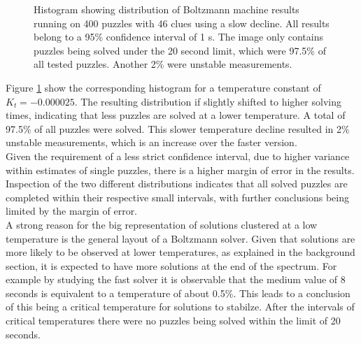 \documentclass[a4paper,11pt]{kth-mag}
\begin{document}
\begin{figure}[here] 
\noindent{}
\vspace{-15pt}
\caption{Histogram showing distribution of Boltzmann machine results running on 400 puzzles with 46 clues using a slow decline. All results belong to a 95\% confidence interval of 1 s. The image only contains puzzles being solved under the 20 second limit, which were 97.5\% of all tested puzzles. Another 2\% were unstable measurements.}
\label{fig:boltzmannMedium}
\end{figure}

Figure \ref{fig:boltzmannMedium} show the corresponding histogram for a temperature constant of $K_t = -0.000025$.
The resulting distribution if slightly shifted to higher solving times, indicating that less puzzles are solved at a lower temperature.
A total of 97.5\% of all puzzles were solved.
This slower temperature decline resulted in 2\% unstable measurements, which is an increase over the faster version. \\

Given the requirement of a less strict confidence interval, due to higher variance within estimates of single puzzles, there is a higher margin of error in the results.
Inspection of the two different distributions indicates that all solved puzzles are completed within their respective small intervals, with further conclusions being limited by the margin of error. \\

A strong reason for the big representation of solutions clustered at a low temperature is the general layout of a Boltzmann solver.
Given that solutions are more likely to be observed at lower temperatures, as explained in the background section, it is expected to have more solutions at the end of the spectrum.
For example by studying the fast solver it is observable that the medium value of 8 seconds is equivalent to a temperature of about 0.5\%.
This leads to a conclusion of this being a critical temperature for solutions to stabilze.
After the intervals of critical temperatures there were no puzzles being solved within the limit of 20 seconds.
\end{document}
